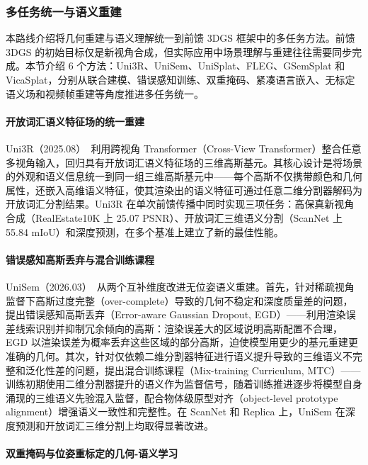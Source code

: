 \subsubsection{多任务统一与语义重建}

本路线介绍将几何重建与语义理解统一到前馈 3DGS 框架中的多任务方法。前馈 3DGS 的初始目标仅是新视角合成，但实际应用中场景理解与重建往往需要同步完成。本节介绍 6 个方法：Uni3R、UniSem、UniSplat、FLEG、GSemSplat 和 VicaSplat，分别从联合建模、错误感知训练、双重掩码、紧凑语言嵌入、无标定语义场和视频帧重建等角度推进多任务统一。

\paragraph{开放词汇语义特征场的统一重建}

Uni3R（2025.08）~\cite{2508_03643}利用跨视角 Transformer（Cross-View Transformer）整合任意多视角输入，回归具有开放词汇语义特征场的三维高斯基元。其核心设计是将场景的外观和语义信息统一到同一组三维高斯基元中——每个高斯不仅携带颜色和几何属性，还嵌入高维语义特征，使其渲染出的语义特征可通过任意二维分割器解码为开放词汇分割结果。Uni3R 在单次前馈传播中同时实现三项任务：高保真新视角合成（RealEstate10K 上 25.07 PSNR）、开放词汇三维语义分割（ScanNet 上 55.84 mIoU）和深度预测，在多个基准上建立了新的最佳性能。

\paragraph{错误感知高斯丢弃与混合训练课程}

UniSem（2026.03）~\cite{2603_17519}从两个互补维度改进无位姿语义重建。首先，针对稀疏视角监督下高斯过度完整（over-complete）导致的几何不稳定和深度质量差的问题，提出错误感知高斯丢弃（Error-aware Gaussian Dropout, EGD）——利用渲染误差线索识别并抑制冗余倾向的高斯：渲染误差大的区域说明高斯配置不合理，EGD 以渲染误差为概率丢弃这些区域的部分高斯，迫使模型用更少的基元重建更准确的几何。其次，针对仅依赖二维分割器特征进行语义提升导致的三维语义不完整和泛化性差的问题，提出混合训练课程（Mix-training Curriculum, MTC）——训练初期使用二维分割器提升的语义作为监督信号，随着训练推进逐步将模型自身涌现的三维语义先验混入监督，配合物体级原型对齐（object-level prototype alignment）增强语义一致性和完整性。在 ScanNet 和 Replica 上，UniSem 在深度预测和开放词汇三维分割上均取得显著改进。

\paragraph{双重掩码与位姿重标定的几何-语义学习}

